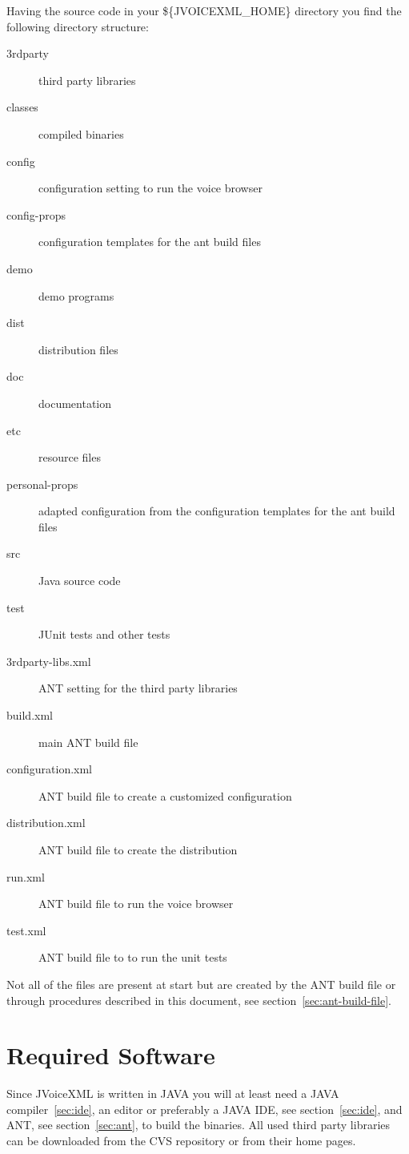\documentclass[11pt,a4paper]{article}
\begin{document}
Having the source code in your \$\{JVOICEXML\_HOME\} directory you
find the following directory structure:

\begin{description}
\item[3rdparty] third party libraries
\item[classes] compiled binaries
\item[config] configuration setting to run the voice browser
\item[config-props] configuration templates for the ant build files
\item[demo] demo programs
\item[dist] distribution files
\item[doc] documentation
\item[etc] resource files
\item[personal-props] adapted configuration from the configuration templates
for the ant build files
\item[src] Java source code
\item[test] JUnit tests and other tests
\item[3rdparty-libs.xml] ANT setting for the third party libraries
\item[build.xml] main ANT build file
\item[configuration.xml] ANT build file to create a customized configuration
\item[distribution.xml] ANT build file to create the distribution
\item[run.xml] ANT build file to run the voice browser
\item[test.xml] ANT build file to to run the unit tests
\end{description}

Not all of the files are present at start but are created by the
ANT build file or through procedures described in this 
document, see section~\ref{sec:ant-build-file}.

\section{Required Software}
\label{sec:required-software}

Since JVoiceXML is written in JAVA you will at least need a
JAVA compiler~\ref{sec:ide}, an editor or preferably a JAVA
IDE, see section~\ref{sec:ide}, and ANT, see section~\ref{sec:ant}, to build the
binaries. All used third party libraries can be downloaded from the CVS 
repository or from their home pages.
\end{document}
